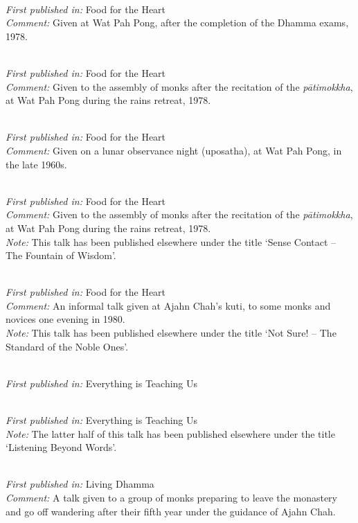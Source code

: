  \\
\textit{First published in:} Food for the Heart \\
\textit{Comment:} Given at Wat Pah Pong, after the completion of the Dhamma exams, 1978.

 \\
\textit{First published in:} Food for the Heart \\
\textit{Comment:} Given to the assembly of monks after the recitation of the \textit{p\=ati\-mokkha}, at Wat Pah Pong during the rains retreat, 1978.

 \\
\textit{First published in:} Food for the Heart \\
\textit{Comment:} Given on a lunar observance night (uposatha), at Wat Pah Pong, in the late 1960s.

 \\
\textit{First published in:} Food for the Heart \\
\textit{Comment:} Given to the assembly of monks after the recitation of the \textit{p\=ati\-mokkha}, at Wat Pah Pong during the rains retreat, 1978. \\
\textit{Note:} This talk has been published elsewhere under the title `Sense Contact -- The Fountain of Wisdom'.

 \\
\textit{First published in:} Food for the Heart \\
\textit{Comment:} An informal talk given at Ajahn Chah's kuti, to some monks and novices one evening in 1980. \\
\textit{Note:} This talk has been published elsewhere under the title `Not Sure! -- The Standard of the Noble Ones'.

 \\
\textit{First published in:} Everything is Teaching Us

 \\
\textit{First published in:} Everything is Teaching Us \\
\textit{Note:} The latter half of this talk has been published elsewhere under the title `Listening Beyond Words'.

 \\
\textit{First published in:} Living Dhamma \\
\textit{Comment:} A talk given to a group of monks preparing to leave the monastery and go off wandering after their fifth year under the guidance of Ajahn Chah.

